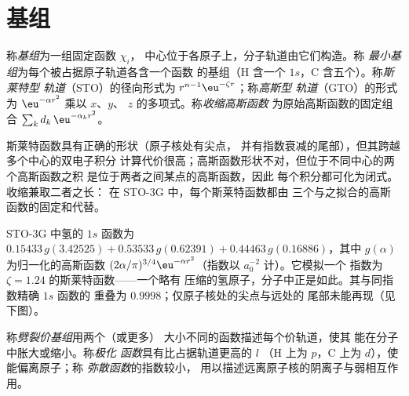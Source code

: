 \section{基组}

\begin{definition}\label{def:b3:computational-chemistry:basis}
称\emph{基组}为一组固定函数 $\chi_i$，
中心位于各原子上，分子轨道由它们构造。称
\emph{最小基组}为每个被占据原子轨道各含一个函数
的基组（H 含一个 $1s$，C 含五个）。称\emph{斯莱特型
轨道}（STO）的径向形式为
$r^{n-1}\eu^{-\zeta r}$；称\emph{高斯型
轨道}（GTO）的形式为 $\eu^{-\alpha r^2}$ 乘以 $x$、$y$、
$z$ 的多项式。称\emph{收缩高斯函数}
为原始高斯函数的固定组合 $\sum_kd_k\,\eu^{-\alpha_kr^2}$。
\end{definition}

斯莱特函数具有正确的形状（原子核处有尖点，
并有指数衰减的尾部），但其跨越多个中心的双电子积分
计算代价很高；高斯函数形状不对，但位于不同中心的两个高斯函数之积
是位于两者之间某点的高斯函数，因此
每个积分都可化为闭式。收缩兼取二者之长：
在 STO-3G 中，每个斯莱特函数都由
三个与之拟合的高斯函数的固定和代替。

\begin{example}[氢的 STO-3G 函数]\label{ex:b3:computational-chemistry:sto3g}
STO-3G 中氢的 $1s$ 函数为 $0.15433\,g(3.42525) + 0.53533\,
g(0.62391) + 0.44463\,g(0.16886)$，其中 $g(\alpha)$ 为归一化的高斯函数
$(2\alpha/\pi)^{3/4}\eu^{-\alpha r^2}$（指数以 $a_0^{-2}$ 计）。它模拟一个
指数为 $\zeta = 1.24$ 的斯莱特函数——一个略有
压缩的氢原子，分子中正是如此。其与同指数精确 $1s$ 函数的
重叠为 $0.9998$；仅原子核处的尖点与远处的
尾部未能再现（见下图）。
\end{example}

\begin{definition}\label{def:b3:computational-chemistry:split-valence}
称\emph{劈裂价基组}用两个（或更多）
大小不同的函数描述每个价轨道，使其
能在分子中胀大或缩小。称\emph{极化
函数}具有比占据轨道更高的 $l$
（H 上为 $p$，C 上为 $d$），使能偏离原子；称
\emph{弥散函数}的指数较小，
用以描述远离原子核的阴离子与弱相互作用。
\end{definition}

